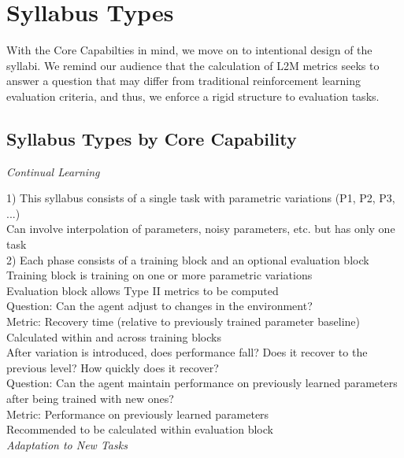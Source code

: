\chapter{Syllabus Types}\label{ch:syllabus_and_metric_types}

With the Core Capabilties in mind, we move on to intentional design of the syllabi. We remind our audience that the calculation of L2M metrics seeks to answer a question that may differ from traditional reinforcement learning evaluation criteria, and thus, we enforce a rigid structure to evaluation tasks.
    
    
\section{Syllabus Types by Core Capability} 


\textit{Continual Learning}

    1) This syllabus consists of a single task with parametric variations (P1, P2, P3, ...)\\
        Can involve interpolation of parameters, noisy parameters, etc. but has only one task\\
    2) Each phase consists of a training block and an optional evaluation block\\
        Training block is training on one or more parametric variations \\
        Evaluation block allows Type II metrics to be computed\\
        
    Question: Can the agent adjust to changes in the environment?\\
        Metric: Recovery time (relative to previously trained parameter baseline)\\
            Calculated within and across training blocks \\
            After variation is introduced, does performance fall? Does it recover to the previous level? How quickly does it recover?\\
    
    Question: Can the agent maintain performance on previously learned parameters after being trained with new ones?\\
        Metric: Performance on previously learned parameters\\
            Recommended to be calculated within evaluation block\\

\textit{Adaptation to New Tasks}

